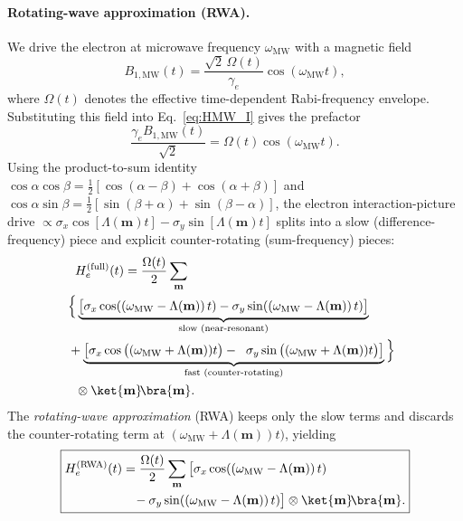 \documentclass[
  aps,
  pra,
  reprint,            %
  superscriptaddress, %
  amsmath,amssymb,
  notitlepage
]{revtex4-2}
\begin{document}
\paragraph{Rotating-wave approximation (RWA).}
We drive the electron at microwave frequency $\omega_{\mathrm{MW}}$ with a magnetic field
\begin{equation}
B_{1,\mathrm{MW}}(t)
=
\frac{\sqrt2\,\Omega(t)}{\gamma_e}
\cos(\omega_{\mathrm{MW}} t),
\end{equation}
where $\Omega(t)$ denotes the effective time-dependent Rabi-frequency envelope. 
Substituting this field into Eq.~\eqref{eq:HMW_I} gives the prefactor
\[
\frac{\gamma_e B_{1,\mathrm{MW}}(t)}{\sqrt2}
=
\Omega(t)\cos(\omega_{\mathrm{MW}} t).
\]
Using the product-to-sum identity $\cos\alpha\cos\beta=\tfrac12[\cos(\alpha-\beta)+\cos(\alpha+\beta)]$
and $\cos\alpha\sin\beta=\tfrac12[\sin(\beta+\alpha)+\sin(\beta-\alpha)]$,
the electron interaction-picture drive
\(
\propto \sigma_x\cos[\Lambda(\mathbf m)t]-\sigma_y\sin[\Lambda(\mathbf m)t]
\)
splits into a slow (difference-frequency) piece and explicit counter-rotating (sum-frequency) pieces:
\begin{align}
&\notag\hspace{-0.0cm}H_{e}^{(\mathrm{full})}(t)= \frac{\Omega(t)}{2}\sum_{\mathbf m}\\
&\hspace{-0.2cm}
\Big\{\underbrace{\big[\sigma_x\cos((\omega_{\mathrm{MW}}-\Lambda(\mathbf m))\,t)-\sigma_y\sin((\omega_{\mathrm{MW}}-\Lambda(\mathbf m))\,t)\big]}_{\text{slow (near-resonant)}}\nonumber\\
&\hspace{-0.2cm}
+\notag \underbrace{\big[\sigma_x\cos\big((\omega_{\mathrm{MW}}+\Lambda(\mathbf m))t\big)- 
\hspace{0.2cm} \sigma_y\sin\big((\omega_{\mathrm{MW}}+\Lambda(\mathbf m))t\big)\big]}_{\text{fast (counter-rotating)}}\Big\}\\
&\otimes \ket{\mathbf m}\!\bra{\mathbf m}.
\label{eq:He_full_split}
\end{align}
The \emph{rotating-wave approximation} (RWA) keeps only the slow terms and discards the counter-rotating term at  $(\omega_{\mathrm{MW}}+\Lambda(\mathbf m))t\big)$, yielding
\begin{equation}
\boxed{
\begin{aligned}
&H_{e}^{(\mathrm{RWA})}(t)
= \frac{\Omega(t)}{2} \sum_{\mathbf m}
\big[\sigma_x\cos((\omega_{\mathrm{MW}}-\Lambda(\mathbf m))\,t)\\ & \hspace{1.9cm}-\sigma_y\sin((\omega_{\mathrm{MW}}-\Lambda(\mathbf m))\,t)\big]
\otimes \ket{\mathbf m}\!\bra{\mathbf m}.
\end{aligned}
}
\label{eq:HeRWA_time_nophase_Lambda_m}
\end{equation}
\end{document}
